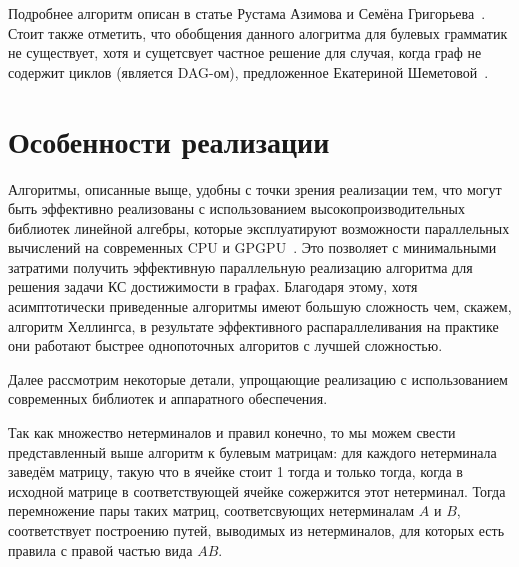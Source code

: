 Подробнее алгоритм описан в статье Рустама Азимова и Семёна Григорьева~\cite{565CECD7E8F5C6063935B41DB41797AA37D53B04}. Стоит также отметить, что обобщения данного алогритма для булевых грамматик не существует, хотя и сущетсвует частное решение для случая, когда граф не содержит циклов (является DAG-ом), предложенное Екатериной Шеметовой~\cite{Shemetova2019}.

\section{Особенности реализации}

Алгоритмы, описанные выще, удобны с точки зрения реализации тем, что могут быть эффективно реализованы с использованием высокопроизводительных библиотек линейной алгебры, которые эксплуатируют возможности параллельных вычислений на современных CPU и  GPGPU~\cite{Mishin:2019:ECP:3327964.3328503}.
Это позволяет с минимальными затратими получить эффективную параллельную реализацию алгоритма для решения задачи КС достижимости в графах.
Благодаря этому, хотя асимптотически приведенные алгоритмы имеют большую сложность чем, скажем, алгоритм Хеллингса, в результате эффективного распараллеливания на практике они работают быстрее однопоточных алгоритов с лучшей сложностью.

Далее рассмотрим некоторые детали, упрощающие реализацию с использованием современных библиотек и аппаратного обеспечения.

Так как множество нетерминалов и правил конечно, то мы можем свести представленный выше алгоритм к булевым матрицам: для каждого нетерминала заведём матрицу, такую что в ячейке стоит 1 тогда и только тогда, когда в исходной матрице в соответствующей ячейке сожержится этот нетерминал.
Тогда перемножение пары таких матриц, соответсвующих нетерминалам $A$ и $B$, соответствует построению путей, выводимых из нетерминалов, для которых есть правила с правой частью вида $A B$.

